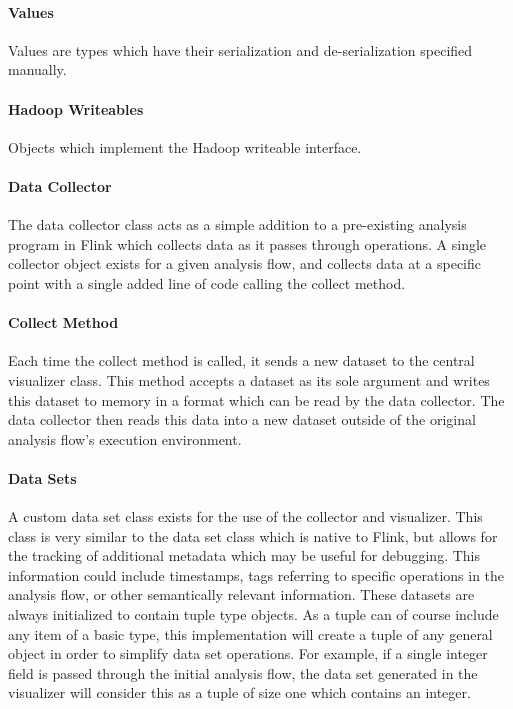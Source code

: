 \paragraph{Values}
Values are types which have their serialization and de-serialization specified manually.

\paragraph{Hadoop Writeables}
Objects which implement the Hadoop writeable interface.

\paragraph{Data Collector}
The data collector class acts as a simple addition to a pre-existing analysis program in Flink which collects data as it passes through operations. A single collector object exists for a given analysis flow, and collects data at a specific point with a single added line of code calling the collect method.

\paragraph{Collect Method}
Each time the collect method is called, it sends a new dataset to the central visualizer class. This method accepts a dataset as its sole argument and writes this dataset to memory in a format which can be read by the data collector. The data collector then reads this data into a new dataset outside of the original analysis flow's execution environment.
  
\paragraph{Data Sets}
A custom data set class exists for the use of the collector and visualizer. This class is very similar to the data set class which is native to Flink, but allows for the tracking of additional metadata which may be useful for debugging. This information could include timestamps, tags referring to specific operations in the analysis flow, or other semantically relevant information. These datasets are always initialized to contain tuple type objects. As a tuple can of course include any item of a basic type, this implementation will create a tuple of any general object in order to simplify data set operations. For example, if a single integer field is passed through the initial analysis flow, the data set generated in the visualizer will consider this as a tuple of size one which contains an integer.

